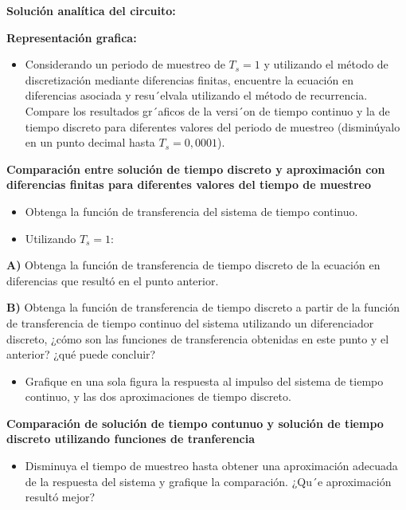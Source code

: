 \textbf{Solución analítica del circuito:}

\textbf{Representación grafica: }


\begin{itemize}
	\item Considerando un periodo de muestreo de $ T_s = 1 $ y utilizando el método de discretización mediante
	diferencias finitas, encuentre la ecuación en diferencias asociada y resu´elvala utilizando el método de recurrencia. Compare los resultados gr´aficos de la versi´on de tiempo continuo y la de tiempo discreto para diferentes valores del periodo de muestreo (disminúyalo en un punto decimal hasta $T_s = 0,0001$).
\end{itemize}

\textbf{Comparación entre solución de tiempo discreto y aproximación con diferencias finitas para diferentes valores del tiempo de muestreo}

\begin{itemize}
	\item Obtenga la función de transferencia del sistema de tiempo continuo.
	\item Utilizando $ T_s = 1 $:
\end{itemize}

\textbf{A)} Obtenga la función de transferencia de tiempo discreto de la ecuación en diferencias que resultó en	el punto anterior.

\textbf{B)}  Obtenga la función de transferencia de tiempo discreto a partir de la función de transferencia de tiempo continuo del sistema utilizando un diferenciador discreto, ¿cómo son las funciones de transferencia obtenidas en este punto y el anterior? ¿qué puede concluir?


\begin{itemize}
	\item Grafique en una sola figura la respuesta al impulso del sistema de tiempo continuo, y las dos aproximaciones
	de tiempo discreto.
\end{itemize}

\textbf{Comparación de solución de tiempo contunuo y solución de tiempo discreto utilizando funciones de tranferencia}

\begin{itemize}
	\item Disminuya el tiempo de muestreo hasta obtener una aproximación adecuada de la respuesta del sistema
	y grafique la comparación. ¿Qu´e aproximación resultó mejor?
\end{itemize}

